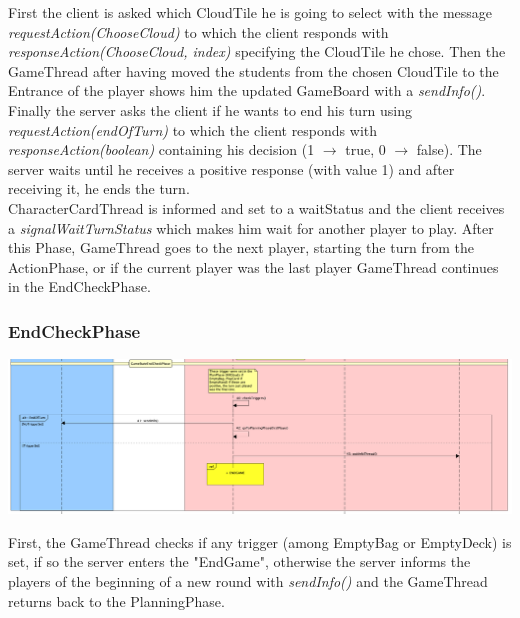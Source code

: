 \documentclass[12pt]{article}
\begin{document}
				First the client is asked which CloudTile he is going to select with the message \emph{requestAction(ChooseCloud)} to which the client responds with \emph{responseAction(ChooseCloud, index)} specifying the CloudTile he chose. Then the GameThread after having moved the students from the chosen CloudTile to the Entrance of the player shows him the updated GameBoard with a \emph{sendInfo()}. \\
				Finally the server asks the client if he wants to end his turn using \emph{requestAction(endOfTurn)} to which the client responds with \emph{responseAction(boolean)} containing his decision (1 $\rightarrow$ true, 0 $\rightarrow$ false). The server waits until he receives a positive response (with value 1) and after receiving it, he ends the turn. \\
				CharacterCardThread is informed and set to a waitStatus and the client receives a \emph{signalWaitTurnStatus} which makes him wait for another player to play. 
				After this Phase, GameThread goes to the next player, starting the turn from the ActionPhase, or if the current player was the last player GameThread continues in the EndCheckPhase.
							
			\subsubsection{EndCheckPhase}
			
				\begin{center}
					\includegraphics[width=\textwidth,height=\textheight,keepaspectratio]{Game_5}
				\end{center}
				
				First, the GameThread checks if any trigger (among EmptyBag or EmptyDeck) is set, if so the server enters the "EndGame", otherwise the server informs the players of the beginning of a new round with \emph{sendInfo()} and the GameThread returns back to the PlanningPhase.
				
\end{document}
